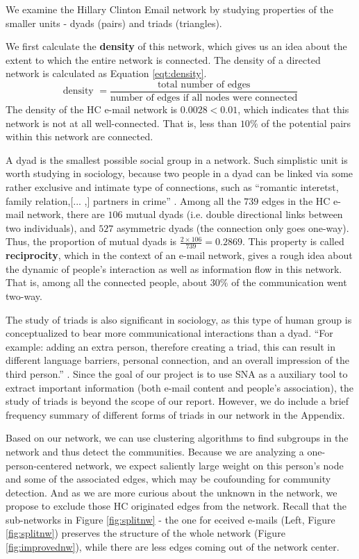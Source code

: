 We examine the Hillary Clinton Email network by studying properties of the smaller units - dyads (pairs) and triads (triangles).   

We first calculate the {\bf density} of this network, which gives us an idea about the extent to which the entire network is connected. The density of a directed network is calculated as Equation \ref{eqt:density}.
\begin{equation}
\label{eqt:density}
\mbox{density }= \frac{\mbox{total number of edges}}{\mbox{number of edges if all nodes were connected}}
\end{equation}
The density of the HC e-mail network is $0.0028<0.01$, which indicates that this network is not at all well-connected. That is, less than $10\%$ of the potential pairs within this network are connected. 

A dyad is the smallest possible social group in a network. 
Such simplistic unit is worth studying in sociology, because two people in a dyad can be linked via some rather exclusive and intimate type of connections, such as ``romantic interetst, family relation,[... ,] partners in crime'' \cite{wiki_dyad}.
Among all the $739$ edges in the HC e-mail network, there are $106$ mutual dyads (i.e. double directional links between two individuals), and $527$ asymmetric dyads (the connection only goes one-way). 
Thus, the proportion of mutual dyads is $\frac{2 \times 106}{739}=0.2869$. 
This property is called {\bf reciprocity}, which in the context of an e-mail network, gives a rough idea about the dynamic of people's interaction as well as information flow in this network. 
That is, among all the connected people, about $30\%$ of the communication went two-way. 

The study of triads is also significant in sociology, as this type of human group is conceptualized to bear more communicational interactions than a dyad. 
``For example: adding an extra person, therefore creating a triad, this can result in different language barriers, personal connection, and an overall impression of the third person.'' \cite{wiki_triad}.
Since the goal of our project is to use SNA as a auxiliary  tool to extract important information (both e-mail content and people's association), the study of triads is beyond the scope of our report. 
However, we do include a brief frequency summary of different forms of triads in our network in the Appendix.

Based on our network, we can use clustering algorithms to find subgroups in the network and thus detect the communities. 
Because we are analyzing a one-person-centered network, we expect saliently large weight on this person's node and some of the associated edges, which may be coufounding for community detection. 
And as we are more curious about the unknown in the network, we propose to exclude those HC originated edges from the network. Recall that the sub-networks in Figure \ref{fig:splitnw} - the one for eceived e-mails (Left, Figure \ref{fig:splitnw}) preserves the structure of the whole network (Figure \ref{fig:improvednw}), while there are less edges coming out of the network center.  


